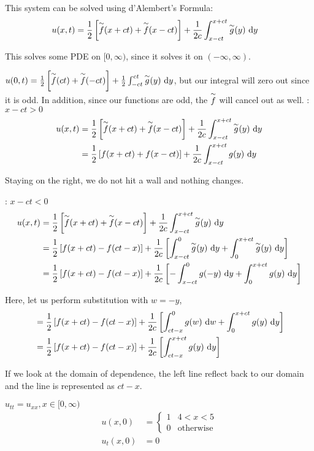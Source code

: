 \documentclass{article}
\begin{document}
This system can be solved using d'Alembert's Formula:
%
\begin{align}
  u(x, t) & = \frac{1}{2} \left[ \overset{\sim}{f}(x + ct) + \overset{\sim}{f}(x - ct) \right]
  + \frac{1}{2c} \int^{x + ct}_{x - ct} \overset{\sim}{g}(y)\ \text dy
\end{align}

\note This solves some PDE on $[0, \infty)$, since it solves it on
$(-\infty, \infty)$.

\note
$u(0, t) = \frac{1}{2} \left[ \overset{\sim}{f}(ct) + \overset{\sim}{f}(-ct)\right]
+ \frac{1}{2} \int^{ct}_{-ct} \overset{\sim}{g}(y)\ \text dy$, but our integral will
zero out since it is odd. In addition, since our functions are odd, the
$\overset{\sim}{f}$ will cancel out as well.
%
: $x - ct > 0$
%
\begin{align}
  u(x, t)
  & = \frac{1}{2} \left[ \overset{\sim}{f}(x + ct) + \overset{\sim}{f}(x - ct) \right] +
  \frac{1}{2c} \int^{x + ct}_{x - ct} \overset{\sim}{g}(y)\ \text dy\\
  & = \frac{1}{2} \left[ f(x + ct) + f(x - ct) \right] +
  \frac{1}{2c} \int^{x + ct}_{x - ct} g(y)\ \text dy
\end{align}

Staying on the right, we do not hit a wall and nothing changes.

: $x - ct < 0$
%
\begin{align}
  u(x, t)
  & = \frac{1}{2} \left[ \overset{\sim}{f}(x + ct) + \overset{\sim}{f}(x - ct) \right] +
  \frac{1}{2c} \int^{x + ct}_{x - ct} \overset{\sim}{g}(y)\ \text dy\\
  & = \frac{1}{2} \left[ f(x + ct) - f(ct - x) \right] +
  \frac{1}{2c}
  \left[
  \int^{0}_{x - ct} \overset{\sim}{g}(y)\ \text dy +
  \int^{x + ct}_{0} \overset{\sim}{g}(y)\ \text dy
   \right]\\
   & = \frac{1}{2} \left[ f(x + ct) - f(ct - x) \right] +
   \frac{1}{2c}
   \left[
   -\int^{0}_{x - ct} g(-y)\ \text dy +
   \int^{x + ct}_{0} g(y)\ \text dy
    \right]
\end{align}

Here, let us perform substitution with $w = -y$,
%
\begin{align}
  & = \frac{1}{2} \left[ f(x + ct) - f(ct - x) \right] +
  \frac{1}{2c}
  \left[
  \int^{0}_{ct - x} g(w)\ \text dw +
  \int^{x + ct}_{0} g(y)\ \text dy
  \right]\\
  & = \frac{1}{2} \left[ f(x + ct) - f(ct - x) \right] +
  \frac{1}{2c}
  \left[
  \int^{x + ct}_{ct - x} g(y)\ \text dy
  \right]
\end{align}

If we look at the domain of dependence, the left line reflect back to our domain and the line is represented as $ct - x$.

\ex $u_{tt} = u_{xx}, x \in [0, \infty)$
%
\begin{align}
  u(x, 0) & =
  \begin{cases}
    1 & 4 < x < 5\\
    0 & \text{otherwise}
  \end{cases}\\
  u_t(x, 0) & = 0
\end{align}
\end{document}
